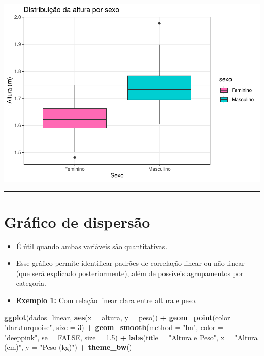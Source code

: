 \documentclass[
]{book}
\newenvironment{Shaded}{\begin{snugshade}}{\end{snugshade}}
\newcommand{\AttributeTok}[1]{\textcolor[rgb]{0.13,0.29,0.53}{#1}}
\newcommand{\ConstantTok}[1]{\textcolor[rgb]{0.56,0.35,0.01}{#1}}
\newcommand{\DecValTok}[1]{\textcolor[rgb]{0.00,0.00,0.81}{#1}}
\newcommand{\FloatTok}[1]{\textcolor[rgb]{0.00,0.00,0.81}{#1}}
\newcommand{\FunctionTok}[1]{\textcolor[rgb]{0.13,0.29,0.53}{\textbf{#1}}}
\newcommand{\NormalTok}[1]{#1}
\newcommand{\SpecialCharTok}[1]{\textcolor[rgb]{0.81,0.36,0.00}{\textbf{#1}}}
\newcommand{\StringTok}[1]{\textcolor[rgb]{0.31,0.60,0.02}{#1}}
\begin{document}
\begin{center}\includegraphics{AED_files/figure-latex/boxplot2-1} \end{center}

\begin{center}\rule{0.5\linewidth}{0.5pt}\end{center}

\section{Gráfico de dispersão}\label{gruxe1fico-de-dispersuxe3o}

\begin{itemize}
\item
  É útil quando ambas variáveis são quantitativas.
\item
  Esse gráfico permite identificar padrões de correlação linear ou não linear (que será explicado posteriormente), além de possíveis agrupamentos por categoria.
\item
  \textbf{Exemplo 1:} Com relação linear clara entre altura e peso.
\end{itemize}

\begin{Shaded}
\begin{Highlighting}[]
\FunctionTok{ggplot}\NormalTok{(dados\_linear, }\FunctionTok{aes}\NormalTok{(}\AttributeTok{x =}\NormalTok{ altura, }\AttributeTok{y =}\NormalTok{ peso)) }\SpecialCharTok{+}
  \FunctionTok{geom\_point}\NormalTok{(}\AttributeTok{color =} \StringTok{"darkturquoise"}\NormalTok{, }\AttributeTok{size =} \DecValTok{3}\NormalTok{) }\SpecialCharTok{+}
  \FunctionTok{geom\_smooth}\NormalTok{(}\AttributeTok{method =} \StringTok{"lm"}\NormalTok{, }\AttributeTok{color =} \StringTok{"deeppink"}\NormalTok{, }\AttributeTok{se =} \ConstantTok{FALSE}\NormalTok{, }\AttributeTok{size =} \FloatTok{1.5}\NormalTok{) }\SpecialCharTok{+}
  \FunctionTok{labs}\NormalTok{(}\AttributeTok{title =} \StringTok{"Altura e Peso"}\NormalTok{,}
       \AttributeTok{x =} \StringTok{"Altura (cm)"}\NormalTok{,}
       \AttributeTok{y =} \StringTok{"Peso (kg)"}\NormalTok{) }\SpecialCharTok{+}
  \FunctionTok{theme\_bw}\NormalTok{()}
\end{Highlighting}
\end{Shaded}
\end{document}
